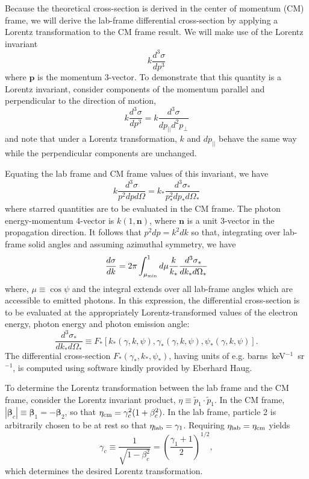\documentclass[12pt]{article}
\begin{document}
Because the theoretical cross-section is derived in the center
of momentum (CM) frame, we will derive the lab-frame
differential cross-section by applying a Lorentz transformation
to the CM frame result.  We will make use of the Lorentz
invariant
\begin{equation}
   k \frac{d^3\sigma}{dp^3}
\end{equation}
where ${\bm p}$ is the momentum 3-vector.
To demonstrate that this quantity is a Lorentz invariant,
consider components of the momentum parallel and perpendicular
to the direction of motion,
\begin{equation}
   k \frac{d^3\sigma}{dp^3} = k \frac{d^3\sigma}{dp_{||}d^2p_\perp}
\end{equation}
and note that under a Lorentz transformation,
$k$ and $dp_{||}$ behave the same way while the perpendicular
components are unchanged.

Equating the lab frame and CM frame values
of this invariant, we have
\begin{equation}
 k \frac{d^3\sigma}{p^2 dp d\Omega} =
  k_* \frac{d^3\sigma_*}{p_*^2 dp_* d\Omega_*}
\end{equation}
where starred quantities are to be evaluated in the CM frame.
The photon energy-momentum 4-vector is $k(1,{\bm n})$, where
${\bm n}$ is a unit 3-vector in the propagation direction.  It
follows that $p^2 dp = k^2 dk$ so that, integrating over
lab-frame solid angles and assuming azimuthal symmetry, we have
\begin{equation}
  \frac{d\sigma}{dk} =
   2\pi \int_{\mu_{\rm min}}^1 d\mu \frac{k}{k_*}
  \frac{d^3\sigma_*}{dk_* d\Omega_*}
\label{sigma-angular-integral}
\end{equation}
where, $\mu \equiv \cos\psi$ and the integral extends over all lab-frame angles
which are accessible to emitted photons.  In this expression,
the differential cross-section is to be evaluated at
the appropriately Lorentz-transformed values of the electron
energy, photon energy and photon emission angle:
\begin{equation}
\frac{d^3\sigma_*}{dk_* d\Omega_*} \equiv
F_*\left[k_*(\gamma, k, \psi), \gamma_*(\gamma, k, \psi), \psi_*(\gamma, k, \psi)\right].
\end{equation}
The differential cross-section $F_*(\gamma_*, k_*, \psi_*)$,
having units of e.g. barns~keV${}^{-1}$~sr${}^{-1}$, is computed using
software kindly provided by Eberhard Haug.

To determine the Lorentz transformation between the lab
frame and the CM frame, consider the Lorentz invariant
product, $\eta \equiv {\tilde p_1}\cdot{\tilde p_1}$.
In the CM frame, $|{\bm \beta_c}| \equiv {\bm \beta_1} = -{\bm \beta_2}$, so that
$\eta_{\rm cm} = \gamma_c^2 (1+\beta_c^2)$.  In the lab frame,
particle 2 is arbitrarily chosen to be at rest so that
$\eta_{\rm lab} = \gamma_1$.  Requiring $\eta_{\rm lab} =
\eta_{\rm cm}$ yields
\begin{equation}
  \gamma_c \equiv \frac{1}{\sqrt{1 - \beta_c^2}} =
\left(\frac{\gamma_1 + 1}{2}\right)^{1/2},
\end{equation}
which determines the desired Lorentz transformation.
\end{document}
